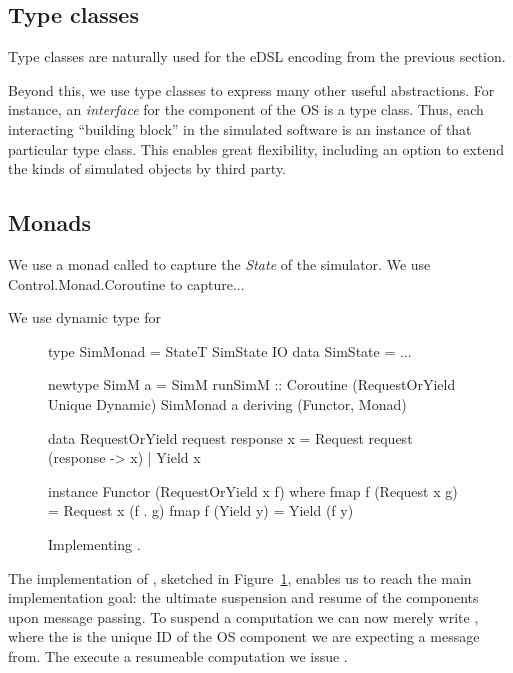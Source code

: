 
\subsection{Type classes}

Type classes are naturally used for the eDSL encoding from the previous section. 

Beyond this, we use type classes to express many other useful abstractions.
For instance, an \emph{interface} for the component of the OS is a type class.
Thus, each interacting ``building block'' in the simulated software is an instance of that particular type class.
This enables great flexibility, including an option to extend the kinds of simulated objects by third party.

\subsection{Monads}
We use a monad called  to capture the \emph{State}
 of the simulator. We use
\textsf{Control.Monad.Coroutine} to capture...

We use dynamic type for 

\begin{figure}
\centering
\begin{code*}
type SimMonad =  StateT SimState IO
data SimState = ...

newtype SimM a
  = SimM { runSimM :: Coroutine
      (RequestOrYield Unique Dynamic)
      SimMonad a }
    deriving (Functor, Monad)

data RequestOrYield request response x
  = Request request (response -> x)
  | Yield   x

instance Functor (RequestOrYield x f) where
  fmap f (Request x g) = Request x (f . g)
  fmap f (Yield y)     = Yield (f y)
\end{code*}
\caption{Implementing .}
\label{fig:code-simm}
\end{figure}

The implementation of , sketched in Figure~\ref{fig:code-simm}, enables us to reach the main implementation goal: the ultimate suspension and resume of the components upon message passing.
To suspend a computation we can now merely write , where the  is the unique ID of the OS component we are expecting a message from.
The execute a resumeable computation we issue .

